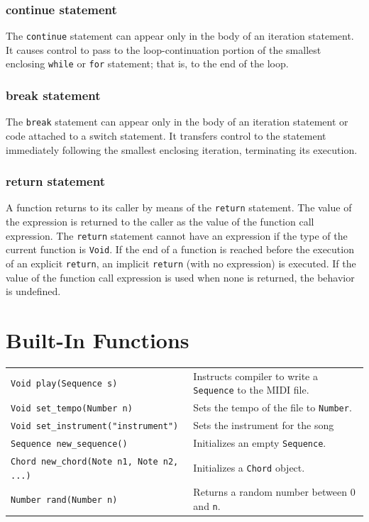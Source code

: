 \documentclass[12pt,A4]{book}
\begin{document}
\subsubsection{continue statement}
The \verb|continue| statement can appear only in the body of an iteration statement.  It causes control to pass to the loop-continuation portion of the smallest enclosing \verb|while| or \verb|for| statement; that is, to the end of the loop.
\subsubsection{break statement}
The \verb|break| statement can appear only in the body of an iteration statement or code attached to a switch statement. It transfers control to the statement immediately following the smallest enclosing iteration, terminating its execution.
\subsubsection{return statement}
A function returns to its caller by means of the \verb|return| statement. The value of the expression is returned to the caller as the value of the function call expression. The \verb|return| statement cannot have an expression if the type of the current function is \verb|Void|.
If the end of a function is reached before the execution of an explicit \verb|return|, an implicit \verb|return| (with no expression) is executed. If the value of the function call expression is used when none is returned, the behavior is undefined.

\section{Built-In Functions}

\begin{tabular}{l p{}}
\verb|Void play(Sequence s)| & Instructs compiler to write a \verb|Sequence| to the MIDI file.\\
\verb|Void set_tempo(Number n)| & Sets the tempo of the file to \verb|Number|.\\
\verb|Void set_instrument("instrument")| & Sets the instrument for the song\\
\verb|Sequence new_sequence()| & Initializes an empty \verb|Sequence|.\\
\verb|Chord new_chord(Note n1, Note n2, ...)| & Initializes a \verb|Chord| object.\\
\verb|Number rand(Number n)| & Returns a random number between 0 and \verb|n|.\\
\end{tabular}
\end{document}
